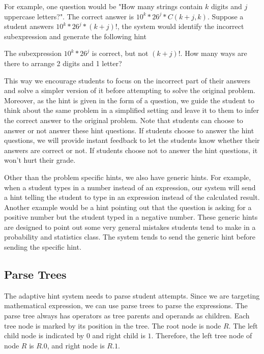 \documentclass{sigchi/sigchi}
\begin{document}
For example, one question would be "How many strings contain $k$ digits and $j$ uppercase letters?". The correct answer is $10^k*26^j*C(k+j,k)$. Suppose a student answers $10^k*26^j*(k+j)!$, the system would identify the incorrect subexpression and generate the following hint

\begin{displayquote}
The subexpression $10^k*26^j$ is correct, but not $(k+j)!$. How many ways are there to arrange 2 digits and 1 letter?
\end{displayquote}


This way we encourage students to focus on the incorrect part of their answers and solve a simpler version of it before attempting to solve the original problem. Moreover, as the hint is given in the form of a question, we guide the student to think about the same problem in a simplified setting and leave it to them to infer the correct answer to the original problem. Note that students can choose to answer or not answer these hint questions. If students choose to answer the hint questions, we will provide instant feedback to let the students know whether their answers are correct or not. If students choose not to answer the hint questions, it won't hurt their grade.

Other than the problem specific hints, we also have generic hints. For example, when a student types in a number instead of an expression, our system will send a hint telling the student to type in an expression instead of the calculated result. Another example would be a hint pointing out that the question is asking for a positive number but the student typed in a negative number. These generic hints are designed to point out some very general mistakes students tend to make in a probability and statistics class. The system tends to send the generic hint before sending the specific hint.


\subsection*{Parse Trees}
The adaptive hint system needs to parse student attempts. Since we are targeting mathematical expression, we can use parse trees to parse the expressions. The parse tree always has operators as tree parents and operands as children. Each tree node is marked by its position in the tree. The root node is node $R$. The left child node is indicated by $0$ and right child is $1$. Therefore, the left tree node of node $R$ is $R.0$, and right node is $R.1$. 
\end{document}
